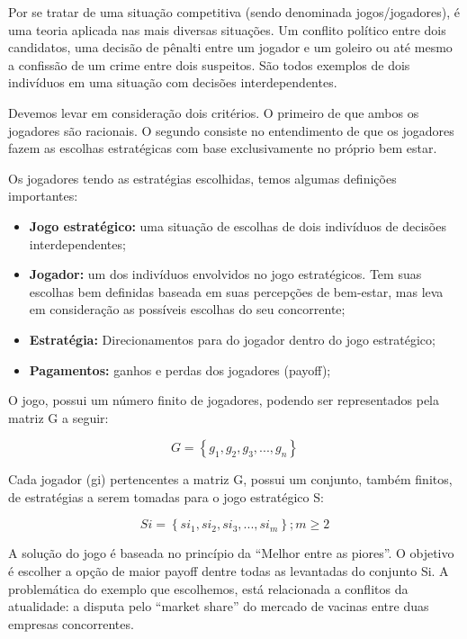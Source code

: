 \documentclass[
	12pt,				%
	openright,			%
	oneside,			%
	a4paper,			%
	english,			%
	french,				%
	spanish,			%
	brazil				%
	]{abntex2}
\begin{document}
Por se tratar de uma situação competitiva (sendo denominada jogos/jogadores), é uma teoria aplicada nas mais diversas situações. Um conflito político entre dois candidatos, uma decisão de pênalti entre um jogador e um goleiro ou até mesmo a confissão de um crime entre dois suspeitos. São todos exemplos de dois indivíduos em uma situação com decisões interdependentes. \cite{hillier2013introduccao}


Devemos levar em consideração dois critérios. O primeiro de que ambos os jogadores são racionais. O segundo consiste no entendimento de que os jogadores fazem as escolhas estratégicas com base exclusivamente no próprio bem estar. 

Os jogadores tendo as estratégias escolhidas, temos algumas definições importantes:

\begin{itemize}
\item \textbf{Jogo estratégico:} uma situação de escolhas de dois indivíduos de decisões interdependentes;
\item \textbf{Jogador:} um dos indivíduos envolvidos no jogo estratégicos. Tem suas escolhas bem definidas baseada em suas percepções de bem-estar, mas leva em consideração as possíveis escolhas do seu concorrente;
\item \textbf{Estratégia:} Direcionamentos para do jogador dentro do jogo estratégico;
\item \textbf{Pagamentos:} ganhos e perdas dos jogadores (payoff);
\end{itemize}

O jogo, possui um número finito de jogadores, podendo ser representados pela matriz G a seguir:

\begin{equation}
G = \left\{g_1,g_2,g_3,...,g_n\right\}
\end{equation}

Cada jogador (gi) pertencentes a matriz G, possui um conjunto, também finitos, de estratégias a serem tomadas para o jogo estratégico S:

\begin{equation}
Si = \left\{si_1,si_2,si_3,...,si_m\right\}; m \geq 2
\end{equation}

A solução do jogo é baseada no princípio da “Melhor entre as piores”. O objetivo é escolher a opção de maior payoff dentre todas as levantadas do conjunto Si. A problemática do exemplo que escolhemos, está relacionada a conflitos da atualidade: a disputa pelo “market share” do mercado de vacinas entre duas empresas concorrentes.
\end{document}
